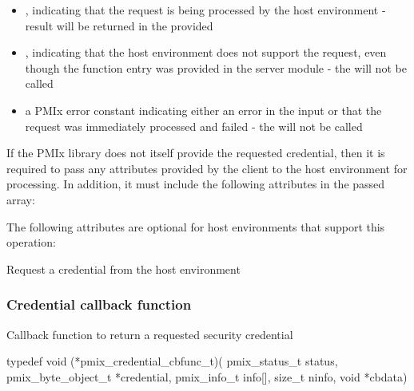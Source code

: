 \begin{itemize}
    \item {}, indicating that the request is being processed by the host environment - result will be returned in the provided 
    \item {}, indicating that the host environment does not support the request, even though the function entry was provided in the server module - the  will not be called
    \item a PMIx error constant indicating either an error in the input or that the request was immediately processed and failed - the  will not be called
\end{itemize}

\reqattrstart
If the \ac{PMIx} library does not itself provide the requested credential, then it is required to pass any attributes provided by the client to the host environment for processing. In addition, it must include the following attributes in the passed  array:


\reqattrend

\optattrstart
The following attributes are optional for host environments that support this operation:


\optattrend

\descr

Request a credential from the host environment


\subsubsection{Credential callback function}

\summary

Callback function to return a requested security credential

\format

\cspecificstart
\begin{codepar}
typedef void (*pmix_credential_cbfunc_t)(
                             pmix_status_t status,
                             pmix_byte_object_t *credential,
                             pmix_info_t info[], size_t ninfo,
                             void *cbdata)
\end{codepar}
\cspecificend

